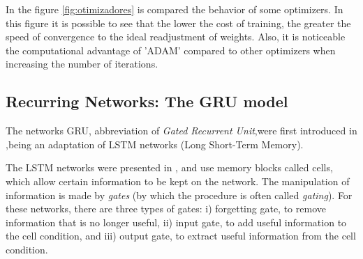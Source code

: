             In the figure \ref{fig:otimizadores} is compared the behavior of some optimizers. In this figure it is possible to see that the lower the cost of training, the greater the speed of convergence to the ideal readjustment of weights. Also, it is noticeable the computational advantage of 'ADAM' compared to other optimizers when increasing the number of iterations.
            
            \begin{figure}[ht]
        
            \end{figure}
            
    \subsection{Recurring Networks: The GRU model}\label{sec:GRU}

    The networks GRU, abbreviation of \textit{Gated Recurrent Unit},were first introduced in \cite{gru},being an adaptation of LSTM networks (Long Short-Term Memory).
    
    The LSTM networks were presented in \cite{lstm}, and use memory blocks called cells, which allow certain information to be kept on the network. The manipulation of information is made by \textit{gates} (by which the procedure is often called \textit{gating}). For these networks, there are three types of gates: i) forgetting gate, to remove information that is no longer useful, ii) input gate, to add useful information to the cell condition, and iii) output gate, to extract useful information from the cell condition. 
    
